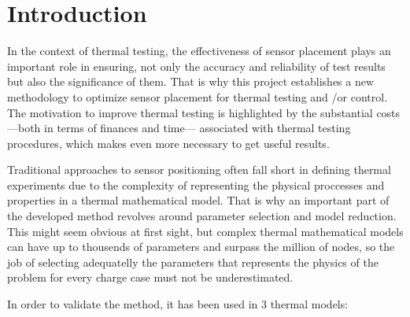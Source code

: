 \chapter{Introduction} \label{ch:chapter_01}

In the context of thermal testing, the effectiveness of sensor placement plays an important role in ensuring, not only the accuracy and reliability of test results but also the significance of them. That is why this project establishes a new methodology to optimize sensor placement for thermal testing and /or control. The motivation to improve thermal testing is highlighted by the substantial costs —both in terms of finances and time— associated with thermal testing procedures, which makes even more necessary to get useful results.

Traditional approaches to sensor positioning often fall short in defining thermal experiments due to the complexity of representing the physical proccesses and properties in a thermal mathematical model. That is why an important part of the developed method revolves around parameter selection and model reduction. This might seem obvious at first sight, but  complex thermal mathematical models can have up to thousends of parameters and surpass the million of nodes, so the job of selecting adequatelly the parameters that represents the physics of the problem for every charge case must not be underestimated.

In order to validate the method, it has been used in 3 thermal models:

